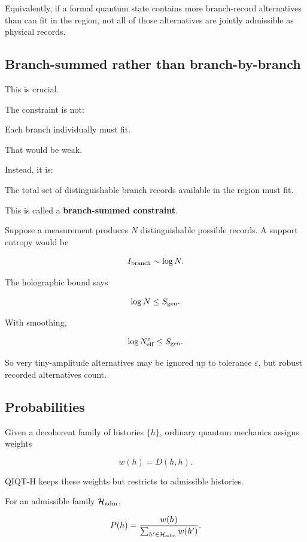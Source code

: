 \documentclass[11pt,a4paper]{article}
\newenvironment{qiqtquote}{\begin{mdframed}[style=quotestyle]}{\end{mdframed}}
\begin{document}
Equivalently, if a formal quantum state contains more branch-record alternatives than can fit in the region, not all of those alternatives are jointly admissible as physical records.

\subsection{Branch-summed rather than branch-by-branch}

This is crucial.

The constraint is not:

\begin{qiqtquote}
Each branch individually must fit.
\end{qiqtquote}

That would be weak.

Instead, it is:

\begin{qiqtquote}
The total set of distinguishable branch records available in the region must fit.
\end{qiqtquote}

This is called a \textbf{branch-summed constraint}.

Suppose a measurement produces $N$ distinguishable possible records. A support entropy would be

\[
I_{\rm branch}\sim \log N.
\]

The holographic bound says

\[
\log N \leq S_{\rm gen}.
\]

With smoothing,

\[
\log N^\varepsilon_{\rm eff}\leq S_{\rm gen}.
\]

So very tiny-amplitude alternatives may be ignored up to tolerance $\varepsilon$, but robust recorded alternatives count.

\subsection{Probabilities}

Given a decoherent family of histories $\{h\}$, ordinary quantum mechanics assigns weights

\[
w(h)=D(h,h).
\]

QIQT-H keeps these weights but restricts to admissible histories.

For an admissible family $\mathcal{H}_{\rm adm}$,

\[
P(h)
=
\frac{w(h)}{\sum_{h'\in \mathcal{H}_{\rm adm}} w(h')}.
\]
\end{document}
